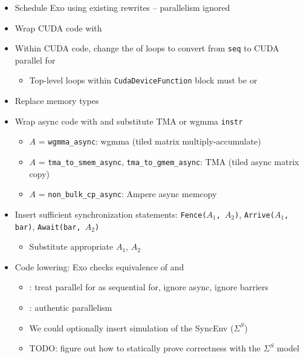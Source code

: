 \newpage
{}

\begin{itemize}
  \item Schedule Exo using existing rewrites -- parallelism ignored
  \item Wrap CUDA code with 
  \item Within CUDA code, change the  of loops to convert from \texttt{seq} to CUDA parallel for
  \begin{itemize}
    \item Top-level loops within \texttt{CudaDeviceFunction} block must be  or 
  \end{itemize}
  \item Replace memory types
  \item Wrap async code with  and substitute TMA or wgmma \texttt{instr}
  \begin{itemize}
    \item $A$ = \texttt{wgmma\_async}: wgmma (tiled matrix multiply-accumulate)
    \item $A$ = \texttt{tma\_to\_smem\_async}, \texttt{tma\_to\_gmem\_async}: TMA (tiled async matrix copy)
    \item $A$ = \texttt{non\_bulk\_cp\_async}: Ampere async memcopy
  \end{itemize}
  \item Insert sufficient synchronization statements: \texttt{Fence($A_1$, $A_2$)}, \texttt{Arrive($A_1$, bar)}, \texttt{Await(bar, $A_2$)}
  \begin{itemize}
    \item Substitute appropriate  $A_1$, $A_2$
  \end{itemize}
  \item Code lowering: Exo checks equivalence of  and 
  \begin{itemize}
    \item {}: treat parallel for as sequential for, ignore async, ignore barriers
    \item {}: authentic parallelism
    \item We could optionally insert simulation of the SyncEnv ($\Sigma^S$)
    \item TODO: figure out how to statically prove correctness with the $\Sigma^S$ model
  \end{itemize}
\end{itemize}

